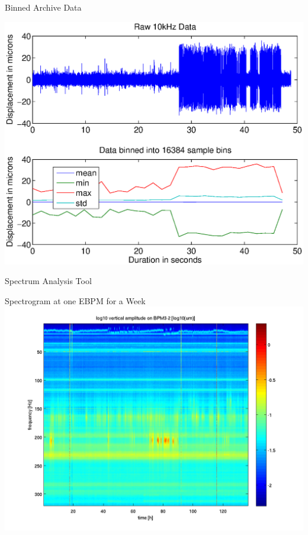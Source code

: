 \documentclass{beamer}
\begin{document}
%
\begin{frame}{Binned Archive Data}
\begin{center}
\includegraphics[width=.9\linewidth]{binning}
\end{center}
\end{frame}


%
\begin{frame}{Spectrum Analysis Tool}
\begin{center}

\end{center}
\end{frame}


%
\begin{frame}{Spectrogram at one EBPM for a Week}
\includegraphics[width=\linewidth]{spectrogram-3-2}
\end{frame}
\end{document}
